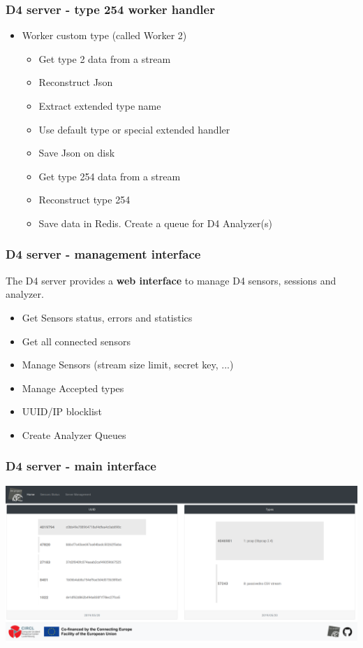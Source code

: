 \documentclass{beamer}
\begin{document}
\begin{frame}
        \frametitle{D4 server - type 254 worker handler}
        \begin{itemize}
          \item Worker custom type (called Worker 2)
                \begin{itemize}
                \item Get type 2 data from a stream
    		        \item Reconstruct Json
                \item Extract extended type name
                \item Use default type or special extended handler
                \item Save Json on disk
                \item Get type 254 data from a stream
                \item Reconstruct type 254
                \item Save data in Redis. Create a queue for D4 Analyzer(s)
                \end{itemize}
        \end{itemize}
\end{frame}

\begin{frame}
        \frametitle{D4 server - management interface}
The D4 server provides a {\bf web interface} to manage D4 sensors, sessions and analyzer.
        \begin{itemize}
\item Get Sensors status, errors and statistics
\item Get all connected sensors
\item Manage Sensors (stream size limit, secret key, ...)
\item Manage Accepted types
\item UUID/IP blocklist
\item  Create Analyzer Queues
        \end{itemize}
\end{frame}

\begin{frame}
        \frametitle{D4 server - main interface}
        \includegraphics[width=\textwidth]{./d4-5.png}
\end{frame}
\end{document}
